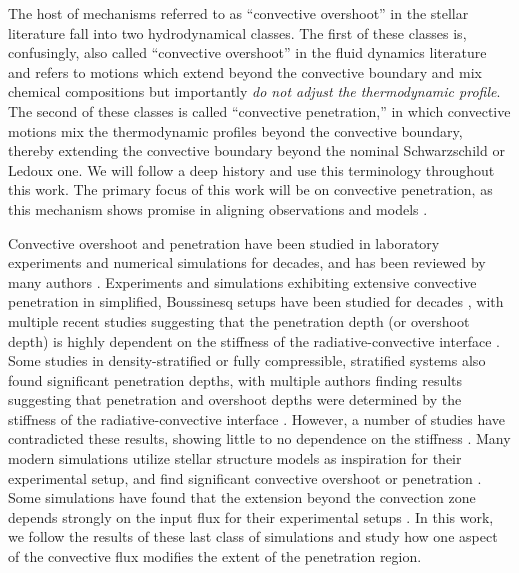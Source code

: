 \documentclass{aastex631}
\begin{document}
The host of mechanisms referred to as ``convective overshoot'' in the stellar literature fall into two hydrodynamical classes.
The first of these classes is, confusingly, also called ``convective overshoot'' in the fluid dynamics literature and refers to motions which extend beyond the convective boundary and mix chemical compositions but importantly \emph{do not adjust the thermodynamic profile}.
The second of these classes is called ``convective penetration,'' in which convective motions mix the thermodynamic profiles beyond the convective boundary, thereby extending the convective boundary beyond the nominal Schwarzschild or Ledoux one.
We will follow a deep history \citep{zahn1991, korre_etal_2019} and use this terminology throughout this work.
The primary focus of this work will be on convective penetration, as this mechanism shows promise in aligning observations and models \citep{christensen-dalsgaard_etal_2011, pedersen_etal_2021}.

Convective overshoot and penetration have been studied in laboratory experiments and numerical simulations for decades, and has been reviewed by many authors \citep{marcus_etal_1983, zahn1991, browning_etal_2004, rogers_etal_2006, viallet_etal_2015, korre_etal_2019}.
Experiments and simulations exhibiting extensive convective penetration in simplified, Boussinesq setups have been studied for decades \citep{ musman1968, deardorff_etal_1969, moore_weiss_1973}, with multiple recent studies suggesting that the penetration depth (or overshoot depth) is highly dependent on the stiffness of the radiative-convective interface \citep{couston_etal_2017, toppaladoddi_wettlaufer_2018, korre_etal_2019}.
Some studies in density-stratified or fully compressible, stratified systems \citep[e.g.,][]{hurlburt_etal_1986, saikia_etal_2000} also found significant penetration depths, with multiple authors finding results suggesting that penetration and overshoot depths were determined by the stiffness of the radiative-convective interface \citep{hurlburt_etal_1994, singh_etal_1995, browning_etal_2004, dietrich_wicht_2018}.
However, a number of studies have contradicted these results, showing little to no dependence on the stiffness \citep{brummell_etal_2002, rogers_glatzmaier_2005}.
Many modern simulations utilize stellar structure models as inspiration for their experimental setup, and find significant convective overshoot or penetration \citep{browning_etal_2004, rogers_etal_2006, kitiashvili_etal_2016, brun_etal_2017, pratt_etal_2017, higl_etal_2021}.
Some simulations have found that the extension beyond the convection zone depends strongly on the input flux for their experimental setups \citep{singh_etal_1998, kapyla_etal_2007, tian_etal_2009, hotta2017, kapyla2019}.
In this work, we follow the results of these last class of simulations and study how one aspect of the convective flux modifies the extent of the penetration region.
\end{document}
